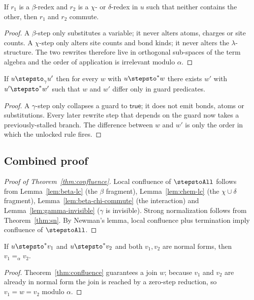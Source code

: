 \begin{lemma}
\label{lem:beta-chi-commute}
If $r_1$ is a $\beta$-redex and $r_2$ is a $\chi$- or $\delta$-redex in
$u$ such that neither contains the other, then $r_1$ and $r_2$ commute.
\end{lemma}
\begin{proof}
A $\beta$-step only substitutes a variable; it never alters atoms,
charges or site counts. A $\chi$-step only alters site counts and bond
kinds; it never alters the $\lambda$-structure. The two rewrites therefore
live in orthogonal sub-spaces of the term algebra and the order of
application is irrelevant modulo $\alpha$.
\end{proof}

\begin{lemma}
\label{lem:gamma-invisible}
If $u \stepsto_\gamma u'$ then for every $w$ with $u \stepsto^* w$ there
exists $w'$ with $u' \stepsto^* w'$ such that $w$ and $w'$ differ only in
guard predicates.
\end{lemma}
\begin{proof}
A $\gamma$-step only collapses a guard to $\mathsf{true}$; it does not
emit bonds, atoms or substitutions. Every later rewrite step that depends
on the guard now takes a previously-stalled branch. The difference between
$w$ and $w'$ is only the order in which the unlocked rule fires.
\end{proof}

\subsection{Combined proof}

\begin{proof}[Proof of Theorem~\ref{thm:confluence}]
Local confluence of $\stepstoAll$ follows from
Lemma~\ref{lem:beta-lc} (the $\beta$ fragment),
Lemma~\ref{lem:chem-lc} (the $\chi \cup \delta$ fragment),
Lemma~\ref{lem:beta-chi-commute} (the interaction) and
Lemma~\ref{lem:gamma-invisible} ($\gamma$ is invisible).
Strong normalization follows from Theorem~\ref{thm:sn}. By Newman's
lemma, local confluence plus termination imply confluence of
$\stepstoAll$.
\end{proof}

\begin{corollary}
If $u \stepsto^* v_1$ and $u \stepsto^* v_2$ and both $v_1, v_2$ are
normal forms, then $v_1 =_{\alpha} v_2$.
\end{corollary}
\begin{proof}
Theorem~\ref{thm:confluence} guarantees a join $w$; because $v_1$ and
$v_2$ are already in normal form the join is reached by a zero-step
reduction, so $v_1 = w = v_2$ modulo $\alpha$.
\end{proof}

